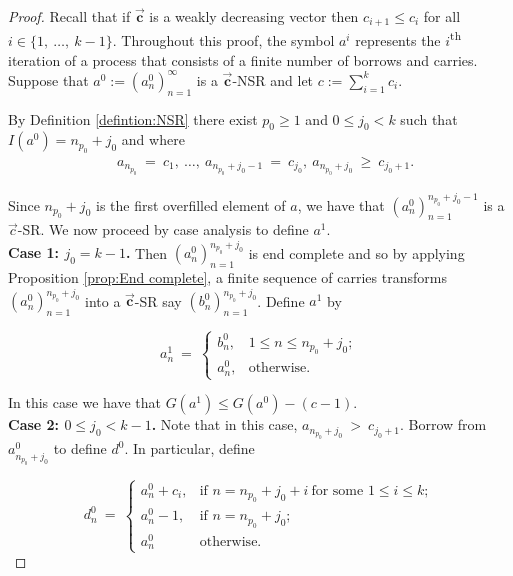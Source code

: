 \documentclass[]{interact}
\newcommand{\vtr}[1]{\vec{\mathbf{#1}}}
\theoremstyle{plain}
\numberwithin{equation}{section} %
\numberwithin{table}{section} %
\numberwithin{figure}{section}
\begin{document}
\begin{proof}

Recall that if $\vtr{c}$ is a weakly decreasing vector then $c_{i+1} \leq c_i$ for all $i \in \{1,\ \ldots,\ k-1 \}$. 
Throughout this proof,  the symbol $a^{i}$ represents the $i$\textsuperscript{th} iteration of a process that consists of a finite number of borrows and carries.
Suppose that $a^{0}:=( a_n^{0} )_{n=1}^{\infty}$ is a $\vtr{c}$-NSR and let $c:=\sum_{i=1}^k c_i$.

By Definition \textcolor{blue}{\ref{defintion:NSR}} there exist $ p_0\geq 1$ and $0\leq j_0< k$ such that $I(a^0)=n_{p_0}+j_0$ and where
\begin{align}
    & a_{n_{p_0}}\ =\ c_1,\ \ldots,\ a_{n_{p_0} + j_0 -1}\ =\ c_{j_0},\  a_{n_{p_0}  + j_0}\ \geq \ c_{j_0+1}. \label{eq:3} 
\end{align}

Since $n_{p_0}+j_0$ is the first overfilled element of $a$, we have that $(a_n^0)_{n=1}^{n_{p_0} + j_0-1}$ is a $\vec{c}$-SR. We now proceed by case analysis to define $a^1$.\\ 

    \noindent \textbf{Case 1: $j_0=k-1$.} Then $(a_n^0)_{n=1}^{n_{p_0} + j_0}$ is end complete and so by applying Proposition \textcolor{blue}{\ref{prop:End complete}}, a finite sequence of carries transforms $(a_n^0)_{n=1}^{n_{p_0} + j_0}$ into a $\vtr{c}$-SR say $(b^{0}_n)_{n=1}^{n_{p_0} + j_0}$. Define $a^1$ by

    $$a_n^{1}\ =\ \begin{cases}
        b^0_n, & 1\leq n\leq n_{p_0}+j_0;\\
        a_n^0, & \text{otherwise.}
    \end{cases}$$

    \noindent In this case we have that $G(a^1)\leq G(a^0)-(c-1)$.\\

   \noindent \textbf{Case 2: $0\leq j_0<k-1$.} Note that in this case, $a_{n_{p_0}  + j_0}\ > \ c_{j_0+1}$. Borrow from $a_{n_{p_0}+j_0}^0$ to define $d^0$. In particular, define

    $$d^0_n\ =\ \begin{cases}
        a_n^0+c_i, & \text{if } n=n_{p_0}+j_0+i\ \text{for some }1\leq i\leq k;\\
        a_n^0-1, & \text{if } n=n_{p_0}+j_0;\\
        a_n^0 & \text{otherwise.}
    \end{cases}$$   
   

\end{proof}
\end{document}
